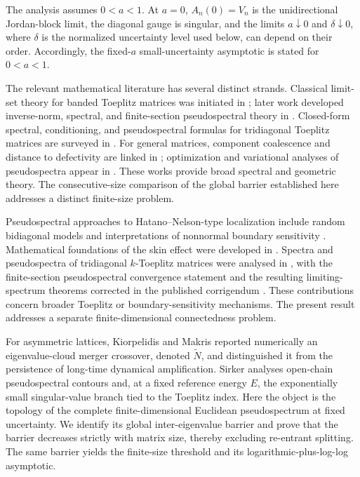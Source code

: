 \documentclass[12pt,anonymous]{iopjournal}
\numberwithin{equation}{section}
\theoremstyle{remark}
\begin{document}
The analysis assumes \(0<a<1\).  At \(a=0\), \(A_n(0)=V_n\) is the
unidirectional Jordan-block limit, the diagonal gauge is singular, and the
limits \(a\downarrow0\) and \(\delta\downarrow0\), where \(\delta\) is the
normalized uncertainty level used below, can depend on their order.
Accordingly, the fixed-\(a\) small-uncertainty asymptotic is stated for
\(0<a<1\).

The relevant mathematical literature has several distinct strands.
Classical limit-set theory for banded Toeplitz matrices was initiated in
\cite{SchmidtSpitzer1960}; later work developed inverse-norm, spectral, and
finite-section pseudospectral theory in
\cite{BottcherGrudskySilbermann1997,ReichelTrefethen1992,
BottcherEmbreeTrefethen2002,BottcherGrudsky2005}.  Closed-form spectral,
conditioning, and pseudospectral formulas for tridiagonal Toeplitz matrices
are surveyed in \cite{NoschesePasquiniReichel2013}.  For general matrices,
component coalescence and distance to defectivity are linked in
\cite{AlamEtAl2011}; optimization and variational analyses of
pseudospectra appear in
\cite{BurkeLewisOverton2003,LewisPang2008}.  These works provide broad
spectral and geometric theory.  The consecutive-size comparison of the
global barrier established here addresses a distinct finite-size problem.

Pseudospectral approaches to Hatano--Nelson-type localization include
random bidiagonal models \cite{TrefethenContediniEmbree2001} and
interpretations of nonnormal boundary sensitivity
\cite{OkumaSato2020,OkumaSato2021}.  Mathematical foundations of the skin
effect were developed in \cite{AmmariEtAl2024}.  Spectra and
pseudospectra of tridiagonal \(k\)-Toeplitz matrices were analysed in
\cite{AmmariEtAl2025}, with the finite-section pseudospectral convergence
statement and the resulting limiting-spectrum theorems corrected in the
published corrigendum \cite{AmmariCorrigendum2026}.  These contributions
concern broader Toeplitz or boundary-sensitivity mechanisms.  The present
result addresses a separate finite-dimensional connectedness problem.

For asymmetric lattices, Kiorpelidis and Makris
\cite{KiorpelidisMakris2025} reported numerically an eigenvalue-cloud merger
crossover, denoted \(\widetilde N\), and distinguished it from the
persistence of long-time dynamical amplification.  Sirker
\cite{Sirker2026} analyses open-chain pseudospectral contours and, at a fixed
reference energy \(E\), the exponentially small singular-value branch tied
to the Toeplitz index.  Here the object is the topology of the complete
finite-dimensional Euclidean pseudospectrum at fixed uncertainty.  We
identify its global inter-eigenvalue barrier and prove that the barrier
decreases strictly with matrix size, thereby excluding re-entrant splitting.
The same barrier yields the finite-size threshold and its
logarithmic-plus-log-log asymptotic.
\end{document}
